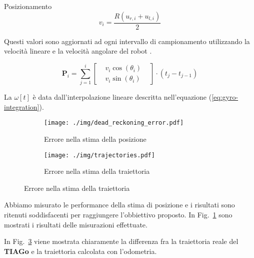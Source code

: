 \documentclass[10pt]{beamer}
\begin{document}
\begin{frame}[allowframebreaks]{Posizionamento}
		\begin{equation}\label{eq:linear-velocity}
			v_i = \frac{R (u_{r,i}+u_{l,i})}{2}
		\end{equation}
		
		Questi valori sono aggiornati ad ogni intervallo di campionamento utilizzando la velocità lineare e la velocità angolare del robot \cite{572228}.
		
		\begin{equation}\label{eq:position-vector-update}
			\textbf{P}_i = \sum_{j = 1}^{i} \begin{bmatrix}
				 & v_i\cos(\theta_i ) & \\
				 & v_i\sin(\theta_i )
			\end{bmatrix}\cdot (t_j-t_{j-1}) 
		\end{equation}
		
		La $\omega [t]$ è data dall'interpolazione lineare descritta nell'equazione (\ref{eq:gyro-integration}).
		
		
		
	\end{frame}
	\begin{frame}
		\begin{figure}[H]
			\begin{subfigure}{0.49\textwidth}
				\centering
				\texttt{[image: ./img/dead\_reckoning\_error.pdf]}
				\caption{Errore nella stima della posizione}
				\label{fig:dead_reckoning_error}
			\end{subfigure}
			\begin{subfigure}{0.49\textwidth}
				\centering
				\texttt{[image: ./img/trajectories.pdf]}
				\caption{Errore nella stima della traiettoria}
				\label{fig:trajectory_error}
			\end{subfigure}
		\end{figure}

		Abbiamo misurato le performance della stima di posizione e i risultati
		sono ritenuti soddisfacenti per raggiungere l'obbiettivo proposto. In
		Fig.~\ref{fig:dead_reckoning_error} sono mostrati i risultati delle
		misurazioni effettuate.

		In Fig.~\ref{fig:trajectory_error} viene mostrata chiaramente la
		differenza fra la traiettoria reale del \textbf{TIAGo} e la traiettoria
		calcolata con l'odometria.  
	\end{frame}
	
\end{document}
